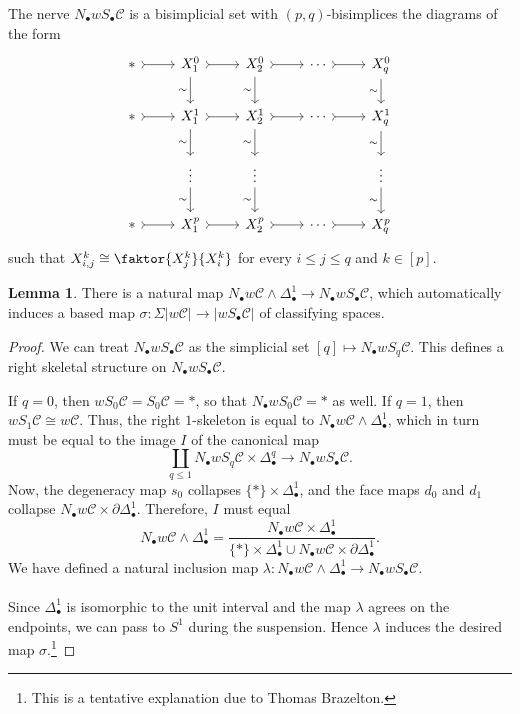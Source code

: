 \documentclass[10pt,letterpaper,cm]{nupset}
\theoremstyle{definition}
\theoremstyle{theorem}
\newtheorem{lemma}[definition]{Lemma}
\theoremstyle{remark}
\newcommand{\1}{\mathbf{1}}
\renewcommand{\c}{\mathscr{C}}
\newcommand{\0}{\vec 0}
\begin{document}
The nerve $N_{\bullet}w S_{\bullet}\c$ is a bisimplicial set with $(p,q)$-bisimplices the diagrams of the form
\[
\begin{tikzcd}
\ast \arrow[r, tail] & X_1^0 \arrow[d, "\sim"'] \arrow[r, tail] & X_2^0 \arrow[r, tail] \arrow[d, "\sim"'] & \cdots \arrow[r, tail] & X_q^0 \arrow[d, "\sim"'] \\
\ast \arrow[r, tail] & X_1^1 \arrow[d, "\sim"'] \arrow[r, tail] & X_2^1 \arrow[r, tail] \arrow[d, "\sim"'] & \cdots \arrow[r, tail] & X_q^1 \arrow[d, "\sim"'] \\
 & \vdots \arrow[d, "\sim"'] & \vdots \arrow[d, "\sim"'] &  & \vdots \arrow[d, "\sim"'] \\
\ast \arrow[r, tail] & X_1^p \arrow[r, tail] & X_2^p \arrow[r, tail] & \cdots \arrow[r, tail] & X_q^p
\end{tikzcd}
\]
such that $X^k_{i,j} \cong \faktor{X_j^k}{X_i^k}$ for every $i\leq j\leq q$ and $k\in [p]$. 


\begin{lemma}
There is a natural map $N_{\bullet} w{\c} \land \Delta_{\bullet}^1 \to N_{\bullet} w S_{\bullet} \c$, which automatically induces a based map $\sigma : \Sigma \lvert{w{\c}}\rvert\to \lvert{w S_{\bullet} \c}\rvert$ of classifying spaces.
\end{lemma}
\begin{proof}
We can treat $N_{\bullet} w S_{\bullet} \c$ as the simplicial set $[q] \mapsto N_{\bullet} w S_q \c$. This defines a right skeletal structure on $N_{\bullet} w S_{\bullet} \c$. 

\medskip

 If $q = 0$, then $w S_0 \c = S_0 \c = \ast$, so that $N_{\bullet} w S_0\c = \ast$ as well. If $q= 1$, then
$w S_1 \c \cong w{\c}$. Thus, the right $1$-skeleton is equal to $N_{\bullet} w{\c}  \land \Delta_{\bullet}^1$, which in turn must be equal to the image $I$ of the canonical map $$\coprod_{q\leq 1} N_{\bullet} w S_q \c \times \Delta_{\bullet}^q \to N_{\bullet} w S_{\bullet} \c.$$ Now, the degeneracy map $s_0$ collapses $\{\ast\} \times \Delta_{\bullet}^1$, and the face maps $d_0$ and $d_1$ collapse $ N_{\bullet} w{\c} \times \partial{\Delta_{\bullet}^1}$. 
Therefore, $I$ must equal $$N_{\bullet} w{\c}  \land \Delta_{\bullet}^1  = \frac{N_{\bullet} w{\c} \times \Delta_{\bullet}^1}{\{\ast\} \times \Delta_{\bullet}^1 \cup N_{\bullet} w{\c} \times \partial{\Delta_{\bullet}^1}}.$$  We have defined a natural inclusion map $\lambda : N_{\bullet} w{\c} \land \Delta_{\bullet}^1 \to  N_{\bullet} w S_{\bullet} \c$.
\\  \\ Since $\Delta_{\bullet}^1$ is isomorphic to the unit interval and the map $\lambda$ agrees on the endpoints, we can pass to $S^1$ during the suspension. Hence $\lambda$  induces the desired map $\sigma$.\footnote{This is a tentative explanation due to Thomas Brazelton.}
\end{proof}
\end{document}
